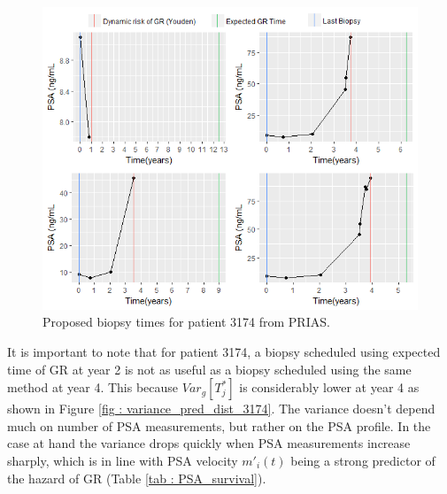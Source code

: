 \begin{figure}[!htb]
\centering
\captionsetup{justification=centering}
\includegraphics[width=\textwidth]{images/prias_demo/case_3174.png}
\caption{\label{fig : prias_demo_pid_3174} Proposed biopsy times for patient 3174 from PRIAS.}
\end{figure}

It is important to note that for patient 3174, a biopsy scheduled using expected time of GR at year 2 is not as useful as a biopsy scheduled using the same method at year 4. This because $Var_g[T^*_j]$ is considerably lower at year 4 as shown in Figure \ref{fig : variance_pred_dist_3174}. The variance doesn't depend much on number of PSA measurements, but rather on the PSA profile. In the case at hand the variance drops quickly when PSA measurements increase sharply, which is in line with PSA velocity $m'_i(t)$ being a strong predictor of the hazard of GR (Table \ref{tab : PSA_survival}).\\


